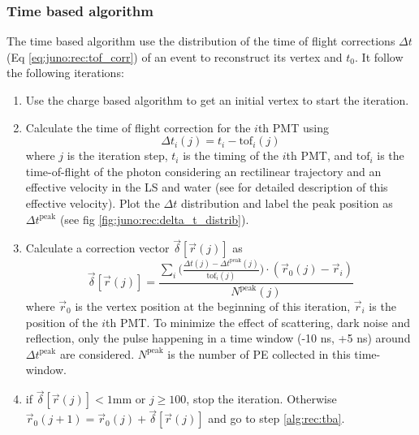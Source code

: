 \documentclass[../main.tex]{subfiles}
\begin{document}
\subsubsection{Time based algorithm}

The time based algorithm use the distribution of the time of flight corrections $\Delta t$ (Eq \ref{eq:juno:rec:tof_corr}) of an event to reconstruct its vertex and $t_0$. It follow the following iterations:

\begin{enumerate}
  \item Use the charge based algorithm to get an initial vertex to start the iteration.

  \item \label{alg:rec:tba} Calculate the time of flight correction for the $i$th PMT using \begin{equation}
      \label{eq:juno:rec:tof_corr}
      \Delta t_i (j) = t_i - \mathrm{tof}_i (j)
    \end{equation}
    where $j$ is the iteration step, $t_i$ is the timing of the $i$th PMT, and $\mathrm{tof}_i$ is the time-of-flight of the photon considering an rectilinear trajectory and an effective velocity in the LS and water (see \cite{li_event_2021} for detailed description of this effective velocity). Plot the $\Delta t$ distribution and label the peak position as $\Delta t^{\mathrm{peak}}$ (see fig \ref{fig:juno:rec:delta_t_distrib}).

  \item Calculate a correction vector $\vec{\delta} [\vec{r}(j)]$ as \begin{equation}
      \vec{\delta} [\vec{r}(j)] = \frac{\sum_i \bigg(\frac{\Delta t(j) - \Delta t^{\mathrm{peak}}(j)}{\mathrm{tof}_i(j)} \bigg) \cdot (\vec{r}_0(j) - \vec{r}_i)}{N^{\mathrm{peak}}(j)}
    \end{equation}
    where $\vec{r}_0$ is the vertex position at the beginning of this iteration, $\vec{r}_i$ is the position of the $i$th PMT. To minimize the effect of scattering, dark noise and reflection, only the pulse happening in a time window (-10 ns, +5 ns) around $\Delta t^{\mathrm{peak}}$ are considered. $N^{\mathrm{peak}}$ is the number of PE collected in this time-window.

  \item if $\vec{\delta} [\vec{r}(j)] < 1 \mathrm{mm}$ or $j \geq 100$, stop the iteration. Otherwise $\vec{r}_0 (j + 1) = \vec{r}_0 (j) + \vec{\delta} [\vec{r}(j)]$ and go to step \ref{alg:rec:tba}.
\end{enumerate}
\end{document}
